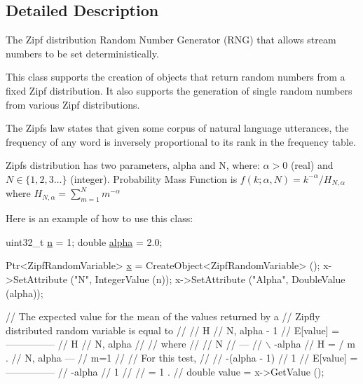 \subsection{Detailed Description}
The Zipf distribution Random Number Generator (R\+NG) that allows stream numbers to be set deterministically. 

This class supports the creation of objects that return random numbers from a fixed Zipf distribution. It also supports the generation of single random numbers from various Zipf distributions.

The Zipf\textquotesingle{}s law states that given some corpus of natural language utterances, the frequency of any word is inversely proportional to its rank in the frequency table.

Zipf\textquotesingle{}s distribution has two parameters, alpha and N, where\+: $ \alpha > 0 $ (real) and $ N \in \{1,2,3 \dots\}$ (integer). Probability Mass Function is $ f(k; \alpha, N) = k^{-\alpha}/ H_{N,\alpha} $ where $ H_{N,\alpha} = \sum_{m=1}^N m^{-\alpha} $

Here is an example of how to use this class\+: 
\begin{DoxyCode}
uint32\_t \hyperlink{namespacesample-rng-plot_aeb5ee5c431e338ef39b7ac5431242e1d}{n} = 1;
\textcolor{keywordtype}{double} \hyperlink{lte__uplink__power__control_8m_a62197192f0fbf4e0675eb37be1c4c175}{alpha} = 2.0;

Ptr<ZipfRandomVariable> \hyperlink{lte__link__budget__x2__handover__measures_8m_a9336ebf25087d91c818ee6e9ec29f8c1}{x} = CreateObject<ZipfRandomVariable> ();
x->SetAttribute (\textcolor{stringliteral}{"N"}, IntegerValue (n));
x->SetAttribute (\textcolor{stringliteral}{"Alpha"}, DoubleValue (alpha));

\textcolor{comment}{// The expected value for the mean of the values returned by a}
\textcolor{comment}{// Zipfly distributed random variable is equal to }
\textcolor{comment}{//}
\textcolor{comment}{//                   H}
\textcolor{comment}{//                    N, alpha - 1}
\textcolor{comment}{//     E[value]  =  ---------------}
\textcolor{comment}{//                     H}
\textcolor{comment}{//                      N, alpha}
\textcolor{comment}{//                          }
\textcolor{comment}{// where}
\textcolor{comment}{//}
\textcolor{comment}{//                    N   }
\textcolor{comment}{//                   ---    }
\textcolor{comment}{//                   \(\backslash\)     -alpha}
\textcolor{comment}{//     H          =  /    m        .}
\textcolor{comment}{//      N, alpha     ---}
\textcolor{comment}{//                   m=1    }
\textcolor{comment}{//                 }
\textcolor{comment}{// For this test,}
\textcolor{comment}{//}
\textcolor{comment}{//                      -(alpha - 1)}
\textcolor{comment}{//                     1}
\textcolor{comment}{//     E[value]  =  ---------------}
\textcolor{comment}{//                      -alpha}
\textcolor{comment}{//                     1}
\textcolor{comment}{//}
\textcolor{comment}{//               =  1  .}
\textcolor{comment}{//               }
\textcolor{keywordtype}{double} value = x->GetValue ();
\end{DoxyCode}
 

